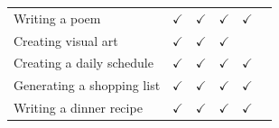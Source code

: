 \documentclass[
  man,
  floatsintext,
  longtable,
  nolmodern,
  notxfonts,
  notimes,
  colorlinks=true,linkcolor=blue,citecolor=blue,urlcolor=blue]{apa7}
\begin{document}
\begin{supptbl}[H]
\begin{minipage}{\linewidth}
\begin{tabular}{lccccc}
Writing a poem & $\checkmark$ & $\checkmark$ & $\checkmark$ & $\checkmark$ & \\
Creating visual art & $\checkmark$ & $\checkmark$ & $\checkmark$ &  & \\
Creating a daily schedule & $\checkmark$ & $\checkmark$ & $\checkmark$ & $\checkmark$ & \\
Generating a shopping list & $\checkmark$ & $\checkmark$ & $\checkmark$ & $\checkmark$ & \\
Writing a dinner recipe & $\checkmark$ & $\checkmark$ & $\checkmark$ & $\checkmark$ & \\
\bottomrule
\end{tabular}
\endgroup{}

\end{minipage}%

\end{supptbl}%

\newpage
\end{document}
